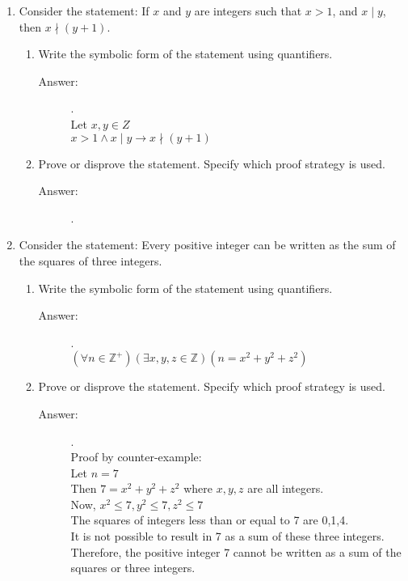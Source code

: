 \documentclass[12pt, oneside]{article}
\begin{document}
\begin{enumerate}
\quad

\item Consider the statement: If $x$ and $y$ are integers such that $x > 1$, and $x \mid y$, then $x\nmid (y+1)$.
\begin{enumerate}
    \item Write the symbolic form of the statement using quantifiers.
    \begin{description}
        \item[Answer:].\\
        Let $x,y \in Z$\\
        $x > 1 \land x \mid y \rightarrow x \nmid (y+1)$\\
    \end{description}
    \item Prove or disprove the statement. Specify which proof strategy is used.
    \begin{description}
        \item[Answer:].\\
        
    \end{description}
\end{enumerate}

\quad

\item Consider the statement: Every positive integer can be written as the sum of the squares of three integers.
\begin{enumerate}
    \item Write the symbolic form of the statement using quantifiers.
    \begin{description}
        \item[Answer:].\\
        $(\forall n \in \mathbb{Z}^+)(\exists x,y,z \in \mathbb{Z})(n=x^2+y^2+z^2)$
    \end{description}
    \item Prove or disprove the statement. Specify which proof strategy is used.
    \begin{description}
        \item[Answer:].\\
        Proof by counter-example:\\
        Let $n=7$\\
        Then $7=x^2+y^2+z^2$ where $x,y,z$ are all integers.\\
        Now, $x^2 \leq 7, y^2 \leq 7, z^2 \leq 7$\\
        The squares of integers less than or equal to 7 are 0,1,4.\\
        It is not possible to result in 7 as a sum of these three integers.\\
        Therefore, the positive integer 7 cannot be written as a sum of the squares or three integers.
    \end{description}
\end{enumerate}

\quad



\end{enumerate}
\end{document}

